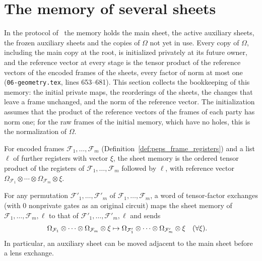 \section{The memory of several sheets}
\label{sec:peps_sheet_stacks}
In the protocol of~\cite[Proposition~7.1]{OpenAI2026PolynomialPEPS} the memory
holds the main sheet, the active auxiliary sheets, the frozen auxiliary sheets
and the copies of $\Omega$ not yet in use. Every copy of $\Omega$, including the
main copy at the root, is initialized privately at its future owner, and the
reference vector at every stage is the tensor product of the reference vectors
of the encoded frames of the sheets, every factor of norm at most one
(\texttt{06-geometry.tex}, lines 653--681). This section collects the
bookkeeping of this memory: the initial private maps, the reorderings of the
sheets, the changes that leave a frame unchanged, and the norm of the reference
vector. The initialization assumes that the product of the reference vectors of the
frames of each party has norm one; for the raw frames of the initial memory, which have
no holes, this is the normalization of $\Omega$.

\begin{definition}
    \label{def:peps_sheet_stack}
    \leanok
    For encoded frames $\mathcal F_1,\dots,\mathcal F_m$ (Definition~\ref{def:peps_frame_registers}) and a list $\ell$ of further registers with vector $\xi$, the sheet memory is the ordered tensor product of the registers of $\mathcal F_1,\dots,\mathcal F_m$ followed by $\ell$, with reference vector $\Omega_{\mathcal F_1}\otimes\cdots\otimes\Omega_{\mathcal F_m}\otimes\xi$.
\end{definition}

\begin{lemma}
    \label{thm:peps_sheet_reordering}
    \leanok
    For any permutation $\mathcal F'_1,\dots,\mathcal F'_m$ of $\mathcal F_1,\dots,\mathcal F_m$, a word of tensor-factor exchanges (with $0$ nonprivate gates as an original circuit) maps the sheet memory of $\mathcal F_1,\dots,\mathcal F_m,\ell$ to that of $\mathcal F'_1,\dots,\mathcal F'_m,\ell$ and sends
    \begin{align}
        \Omega_{\mathcal F_1}\otimes\cdots\otimes\Omega_{\mathcal F_m}\otimes\xi
         & \mapsto \Omega_{\mathcal F'_1}\otimes\cdots\otimes\Omega_{\mathcal F'_m}\otimes\xi \quad (\forall \xi). \notag
    \end{align}
    In particular, an auxiliary sheet can be moved adjacent to the main sheet before a lens exchange.
\end{lemma}

